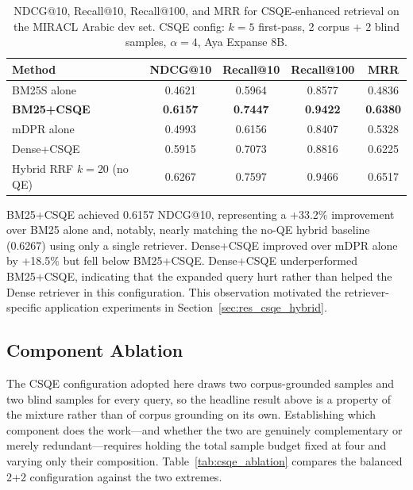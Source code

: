 \begin{table}[htbp]
    \centering
    \caption[CSQE retrieval results]{NDCG@10, Recall@10, Recall@100, and MRR for CSQE-enhanced retrieval on the MIRACL Arabic dev set. CSQE config: $k=5$ first-pass, 2 corpus + 2 blind samples, $\alpha=4$, Aya Expanse 8B.}
    \label{tab:csqe_main}
    \begin{tabular}{@{}lcccc@{}}
        \toprule
        \textbf{Method} & \textbf{NDCG@10} & \textbf{Recall@10} & \textbf{Recall@100} & \textbf{MRR} \\
        \midrule
        BM25S alone & 0.4621 & 0.5964 & 0.8577 & 0.4836 \\
        \textbf{BM25+CSQE} & \textbf{0.6157} & \textbf{0.7447} & \textbf{0.9422} & \textbf{0.6380} \\
        \midrule
        mDPR alone & 0.4993 & 0.6156 & 0.8407 & 0.5328 \\
        Dense+CSQE & 0.5915 & 0.7073 & 0.8816 & 0.6225 \\
        \midrule
        Hybrid RRF $k=20$ (no QE) & 0.6267 & 0.7597 & 0.9466 & 0.6517 \\
        \bottomrule
    \end{tabular}
\end{table}

BM25+CSQE achieved 0.6157 NDCG@10, representing a +33.2\% improvement over BM25 alone and, notably, nearly matching the no-QE hybrid baseline (0.6267) using only a single retriever. Dense+CSQE improved over mDPR alone by +18.5\% but fell below BM25+CSQE. Dense+CSQE underperformed BM25+CSQE, indicating that the expanded query hurt rather than helped the Dense retriever in this configuration. This observation motivated the retriever-specific application experiments in Section~\ref{sec:res_csqe_hybrid}.

\subsection{Component Ablation}
\label{sec:res_csqe_ablation}

The CSQE configuration adopted here draws two corpus-grounded samples and two blind samples for every query, so the headline result above is a property of the mixture rather than of corpus grounding on its own. Establishing which component does the work---and whether the two are genuinely complementary or merely redundant---requires holding the total sample budget fixed at four and varying only their composition. Table~\ref{tab:csqe_ablation} compares the balanced 2+2 configuration against the two extremes.

